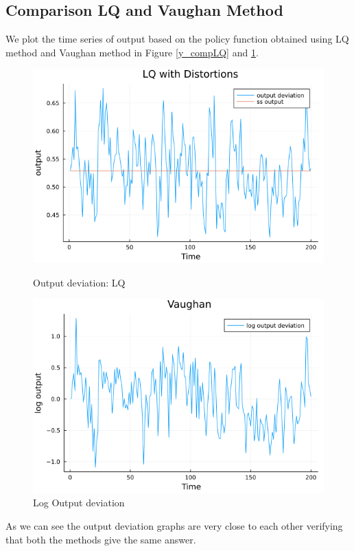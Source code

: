 \documentclass[12pt]{article}
\begin{document}
\subsection{Comparison LQ and  Vaughan Method}
We plot the time series of output based on the policy function obtained using LQ method and Vaughan method in Figure \ref{y_compLQ} and \ref{y_compV}.
\begin{figure}[h]
    \centering
    \begin{minipage}{0.45\textwidth}
        \centering
        \includegraphics[width=1\textwidth]{y_dev_LQ_new.png} %
        \caption{Output deviation: LQ}\label{y_compLQ}
    \end{minipage}\hfill
    \begin{minipage}{0.45\textwidth}
        \centering
        \includegraphics[width=1\textwidth]{log_y_dev_vaughan_new.png} %
        \caption{Log Output deviation}\label{y_compV}
    \end{minipage}
\end{figure}
As we can see the output deviation graphs are very close to each other verifying that both the methods give the same answer.
\end{document}

